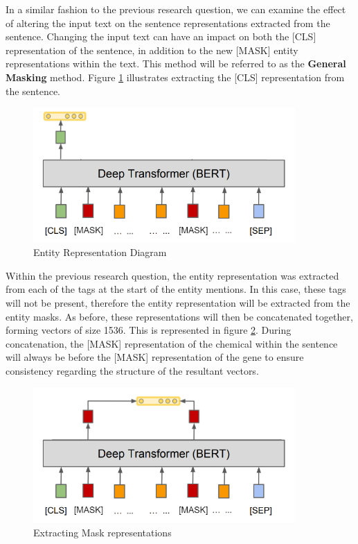 \documentclass{l4proj}
\begin{document}
In a similar fashion to the previous research question, we can examine the effect of altering the input text on the sentence representations extracted from the sentence. Changing the input text can have an impact on both the [CLS] representation of the sentence, in addition to the new [MASK] entity representations within the text. This method will be referred to as the \textbf{General Masking} method. Figure \ref{fig:EMMASK} illustrates extracting the [CLS] representation from the sentence.

\begin{figure}[htb]
    \centering
    \includegraphics[width=10cm]{images/CLSMASK.png}
  \caption{Entity Representation Diagram}
  \label{fig:EMMASK}
\end{figure}

Within the previous research question, the entity representation was extracted from each of the tags at the start of the entity mentions. In this case, these tags will not be present, therefore the entity representation will be extracted from the entity masks. As before, these representations will then be concatenated together, forming vectors of size 1536. This is represented in figure \ref{fig:Masked}. During concatenation, the [MASK] representation of the chemical within the sentence will always be before the [MASK] representation of the gene to ensure consistency regarding the structure of the resultant vectors.

\begin{figure}[htb]
    \centering
    \includegraphics[width=10cm]{images/EMMask.png}
  \caption{Extracting Mask representations}
  \label{fig:Masked}
\end{figure}
\end{document}

